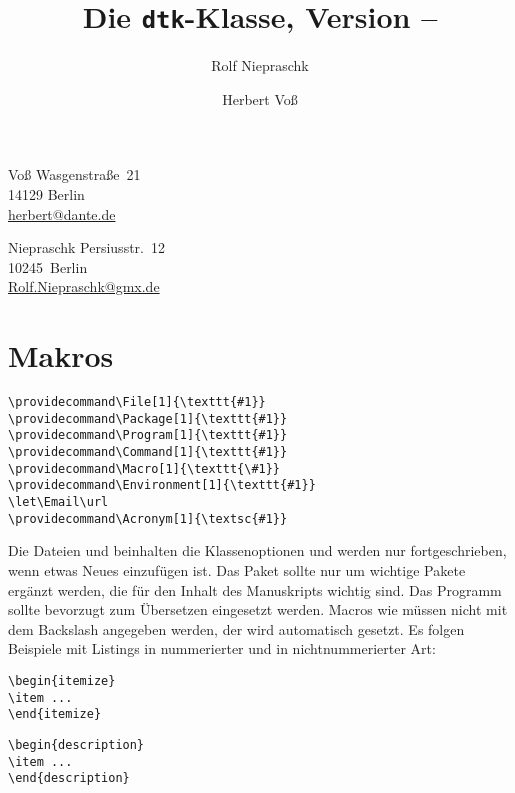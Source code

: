 \documentclass[12,ngerman]{dtk}
\begin{document}
\title{Die \texttt{dtk}-Klasse, \small Version \DTKversion -- \DTKdate}
\author{Rolf Niepraschk\and Herbert Voß}
\address{Herbert}{Voß}
    {Wasgenstraße~21\\
     14129 Berlin\\
     \protect\url{herbert@dante.de}}
\address{Rolf}{Niepraschk}%
    {Persiusstr.~12\\
     10245~Berlin\\
     \protect\url{Rolf.Niepraschk@gmx.de}}
\maketitle

\section{Makros}

\begin{verbatim}
\providecommand\File[1]{\texttt{#1}}
\providecommand\Package[1]{\texttt{#1}}
\providecommand\Program[1]{\texttt{#1}}
\providecommand\Command[1]{\texttt{#1}}
\providecommand\Macro[1]{\texttt{\#1}}
\providecommand\Environment[1]{\texttt{#1}}
\let\Email\url
\providecommand\Acronym[1]{\textsc{#1}}
\end{verbatim}

Die Dateien  und  beinhalten die Klassenoptionen und
werden nur fortgeschrieben, wenn etwas Neues einzufügen ist. Das Paket
 sollte nur um wichtige Pakete ergänzt werden, die für den Inhalt
des Manuskripts wichtig sind. Das Programm  sollte bevorzugt
zum Übersetzen eingesetzt werden. Macros wie  müssen nicht mit
dem Backslash angegeben werden, der wird automatisch gesetzt. Es folgen
Beispiele mit Listings in nummerierter und in nichtnummerierter Art:

\begin{lstlisting}[style=DTKlstNumber]
\begin{itemize}
\item ...
\end{itemize}
\end{lstlisting}

\begin{lstlisting}[style=DTKlstNoNumber]
\begin{description}
\item ...
\end{description}
\end{lstlisting}
\end{document}
